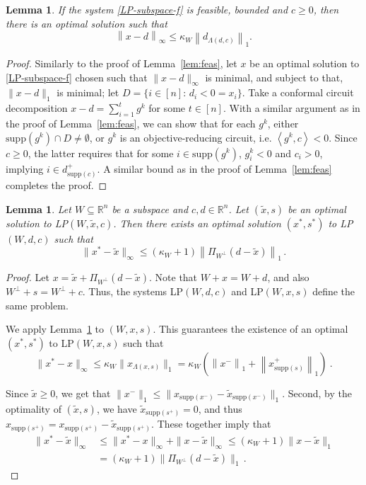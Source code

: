 \documentclass[11pt, a4paper]{article}
\newcommand{\Le}{\kappa}
\newcommand{\pr}[2]{\left\langle #1, #2 \right\rangle}
\newcommand{\supp}{\mathrm{supp}}
\newcommand{\1}{\mathbbm{1}}
\newcommand{\proj}{\Pi}
\newtheorem{lemma}[theorem]{Lemma}
\theoremstyle{case}
\newcommand{\R}{\mathbb{R}}
\begin{document}
\begin{lemma}\label{lem:opt}
  If the system \ref{LP-subspace-f} is feasible, bounded and $c\ge 0$, then there is an optimal solution such that 
  \[
  \left\|x-d\right\|_\infty\le \Le_W \left\|d_{\Lambda(d,c)}\right\|_1. \]
  \end{lemma}
  \begin{proof}
Similarly to the proof of Lemma~\ref{lem:feas}, let $x$ be an optimal solution to \ref{LP-subspace-f} chosen such  that $\|x-d\|_\infty$ is minimal, and subject to that, $\|x-d\|_1$ is minimal; let $D=\{i\in [n]:\, d_i<0=x_i\}$. Take a conformal circuit decomposition $x-d = \sum_{i = 1}^t g^k$ for some $t \in [n]$. 
    With a similar argument as in the proof of Lemma~\ref{lem:feas}, we can show that for each $g^k$, either $\supp(g^k)\cap D\neq\emptyset$, or $g^k$ is an objective-reducing circuit, i.e. $\pr{g^k}{c} < 0$. Since $c\ge 0$, the latter requires that for some $i\in\supp(g^k)$, $g^k_i<0$ and $c_i>0$, implying $i\in d_{\supp(c)}^+$. A similar bound as in the proof of Lemma~\ref{lem:feas} completes the proof.
      \end{proof}
  

\begin{lemma}\label{lem:primal_prox}
  Let $W\subseteq \R^n$ be a subspace and $c, d \in \R^n$.
  Let $(\tilde x, s)$ be an optimal solution to
   LP$(W,\tilde x,c)$. Then there exists an optimal solution $(x^*, s^*)$ to LP$(W,d,c)$ such that
  \[
      \|x^* - \tilde x\|_\infty \le (\kappa_W + 1)\left\|\proj_{W^\perp}(d-\tilde x)\right\|_1 \, .
   \]
  \end{lemma}
  \begin{proof}
  Let $x=\tilde x + \proj_{W^\perp}(d - \tilde x)$. Note that $W+x=W+d$, and also $W^\perp+s=W^\perp+c$. Thus, the systems
    LP$(W,d,c)$ and LP$(W,x,s)$ define the same problem.
  
    We apply Lemma~\ref{lem:opt} to $(W,x,s)$. This guarantees the existence of an optimal $(x^*,s^*)$
   to  LP$(W,x,s)$  such that 
   \[
   \|x^*-x\|_\infty\le \kappa_W\|x_{\Lambda(x,s)}\|_1=\kappa_W\left( \left\|x^-\right\|_1+\left\|x_{\supp(s)}^+\right\|_1\right)\ .
   \]
   
   Since $\tilde x\ge 0$, we get that $\|x^-\|_1\le \|x_{\supp(x^-)}-\tilde x_{\supp(x^-)}\|_1$. Second, by the optimality of $(\tilde x, s)$, we have $\tilde x_{\supp(s^+)}=0$, and thus $x_{\supp(s^+)} = x_{\supp(s^+)}-\tilde x_{\supp(s^+)}$. These together imply that
   \[
   \begin{aligned}
   \|x^* - \tilde x\|_\infty &\le \|x^* - x\|_\infty + \|x - \tilde x\|_\infty \le (\kappa_W+1) \|x - \tilde x\|_1\\
   &= (\kappa_W + 1)\|\proj_{W^\perp}(d-\tilde x)\|_1\, . 
   \end{aligned}
   \]
  \end{proof}
\end{document}
